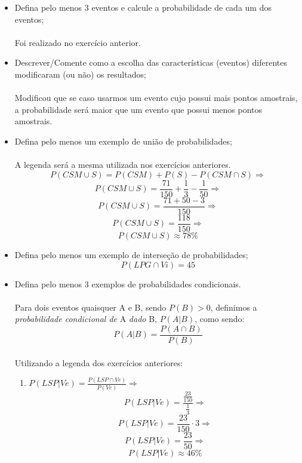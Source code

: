 \documentclass[a4paper, 12pt]{article}
\begin{document}
\begin{enumerate}
\begin{itemize}
\begin{itemize}
  \end{itemize}
  

\item Defina pelo menos 3 eventos e calcule a probabilidade de cada um dos eventos;\\\\
  Foi realizado no exercício anterior.

\item Descrever/Comente como a escolha das características (eventos) diferentes modificaram (ou não) os resultados;\\\\
  Modificou que se caso usarmos um evento cujo possui mais pontos amostrais, a probabilidade será maior que um evento que possui menos pontos amostrais.

\item Defina pelo menos um exemplo de união de probabilidades;\\\\
  A legenda será a mesma utilizada nos exercícios anteriores.\\
  $$P(CSM \cup S) = P(CSM) + P(S) - P(CSM \cap S) \Rightarrow$$
  $$P(CSM \cup S) = \frac{71}{150} + \frac{1}{3} - \frac{1}{50} \Rightarrow$$
  $$P(CSM \cup S) = \frac{71+50-3}{150} \Rightarrow$$
  $$P(CSM \cup S) = \frac{118}{150} \Rightarrow$$    
  $$\boxed{P(CSM \cup S) \approx 78\%} $$


\item Defina pelo menos um exemplo de interseção de probabilidades;\\
  $$P(LPG \cap Vi) = 45 $$

\item Defina pelo menos 3 exemplos de probabilidades condicionais. \\\\
  Para dois eventos quaisquer A e B, sendo $P(B)>0$, definimos a \emph{probabilidade condicional de} A \emph{dado} B, $P(A|B)$, como sendo:\\
  $$P(A|B)=\frac{P(A \cap B)}{P(B)}$$\\
  Utilizando a legenda dos exercícios anteriores:\\
  \begin{enumerate}
  \item $P(LSP|Ve)=\frac{P(LSP \cap Ve)}{P(Ve)} \Rightarrow$
    $$P(LSP|Ve)=\frac{\frac{23}{150}}{\frac{1}{3}} \Rightarrow$$
    $$P(LSP|Ve)=\frac{23}{150}\cdot3 \Rightarrow$$
    $$P(LSP|Ve)=\frac{23}{50} \Rightarrow$$
    $$\boxed{P(LSP|Ve)\approx46\%} $$
    

\end{enumerate}
\end{itemize}
\end{enumerate}
\end{document}
